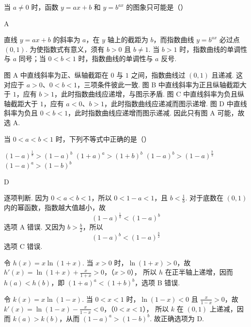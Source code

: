 \documentclass[UTF8,a4paper,oneside,11pt]{ctexbook}
\begin{document}
\begin{problem}
当 \(a\neq 0\) 时，函数 \(y=ax+b\) 和 \(y=b^{ax}\) 的图象只可能是（\quad）

\choices
    {}
    {}
    {}
    {}
\end{problem}

\begin{answer}
A
\end{answer}

\begin{solution}
直线 \(y=ax+b\) 的斜率为 \(a\)，在 \(y\) 轴上的截距为 \(b\)，而指数曲线 \(y=b^{ax}\) 必过点 \((0,1)\). 为使指数式有意义，须有 \(b>0\) 且 \(b\ne1\). 当 \(b>1\) 时，指数曲线的单调性与 \(a\) 同号；当 \(0<b<1\) 时，指数曲线的单调性与 \(a\) 反号.

图 A 中直线斜率为正、纵轴截距在 \(0\) 与 \(1\) 之间，指数曲线过 \((0,1)\) 且递减. 这对应于 \(a>0\)、\(0<b<1\)，三项条件彼此一致. 图 B 中直线斜率为正且纵轴截距大于 \(1\)，应有 \(b>1\)，此时指数曲线应递增，与图示矛盾. 图 C 中直线斜率为负且纵轴截距大于 \(1\)，应有 \(a<0\)、\(b>1\)，此时指数曲线应递减而图示递增. 图 D 中直线斜率为负且 \(0<b<1\)，此时指数曲线应递增而图示递减. 因此只有图 A 可能，故选 A.
\end{solution}

\begin{problem}
当 \(0<a<b<1\) 时，下列不等式中正确的是（\quad）

\choices
    {\((1-a)^{\frac{1}{b}}>(1-a)^b\)}
    {\((1+a)^a>(1+b)^b\)}
    {\((1-a)^b>(1-a)^{\frac{b}{2}}\)}
    {\((1-a)^a>(1-b)^b\)}
\end{problem}

\begin{answer}
D
\end{answer}

\begin{solution}
逐项判断. 因为 \(0<a<b<1\)，所以 \(0<1-a<1\)，且 \(b<\frac{1}{b}\). 对于底数在 \((0,1)\) 内的幂函数，指数越大值越小，故
\[
(1-a)^{\frac{1}{b}}<(1-a)^b
\]
选项 A 错误. 又因为 \(b>\frac b2\)，所以
\[
(1-a)^b<(1-a)^{\frac{b}{2}}
\]
选项 C 错误.

令 \(h(x)=x\ln(1+x)\). 当 \(x>0\) 时，\(\ln(1+x)>0\)，故
\(h'(x)=\ln(1+x)+\frac{x}{1+x}>0\)，（\(x>0\)），
所以 \(h\) 在正半轴上递增，因而 \(h(a)<h(b)\)，即 \((1+a)^a<(1+b)^b\)，选项 B 错误.

令 \(k(x)=x\ln(1-x)\). 当 \(0<x<1\) 时，\(\ln(1-x)<0\) 且 \(\frac{x}{1-x}>0\)，故
\(k'(x)=\ln(1-x)-\frac{x}{1-x}<0\)，（\(0<x<1\)），
所以 \(k\) 在 \((0,1)\) 上递减，因而 \(k(a)>k(b)\)，从而 \((1-a)^a>(1-b)^b\). 故正确选项为 D.
\end{solution}
\end{document}
